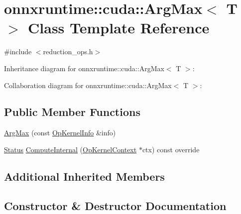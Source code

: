 \hypertarget{classonnxruntime_1_1cuda_1_1ArgMax}{}\section{onnxruntime\+:\+:cuda\+:\+:Arg\+Max$<$ T $>$ Class Template Reference}
\label{classonnxruntime_1_1cuda_1_1ArgMax}


{\ttfamily \#include $<$reduction\+\_\+ops.\+h$>$}



Inheritance diagram for onnxruntime\+:\+:cuda\+:\+:Arg\+Max$<$ T $>$\+:


Collaboration diagram for onnxruntime\+:\+:cuda\+:\+:Arg\+Max$<$ T $>$\+:
\subsection*{Public Member Functions}
\begin{DoxyCompactItemize}
\item 
\mbox{\hyperlink{classonnxruntime_1_1cuda_1_1ArgMax_a65fb6182830d4b9d1cffea3001d0671e}{Arg\+Max}} (const \mbox{\hyperlink{classonnxruntime_1_1OpKernelInfo}{Op\+Kernel\+Info}} \&info)
\item 
\mbox{\hyperlink{classonnxruntime_1_1common_1_1Status}{Status}} \mbox{\hyperlink{classonnxruntime_1_1cuda_1_1ArgMax_a0c5c20fc8c137945fa12b53005374c87}{Compute\+Internal}} (\mbox{\hyperlink{classonnxruntime_1_1OpKernelContext}{Op\+Kernel\+Context}} $\ast$ctx) const override
\end{DoxyCompactItemize}
\subsection*{Additional Inherited Members}


\subsection{Constructor \& Destructor Documentation}
\mbox{\label{classonnxruntime_1_1cuda_1_1ArgMax_a65fb6182830d4b9d1cffea3001d0671e}} 
